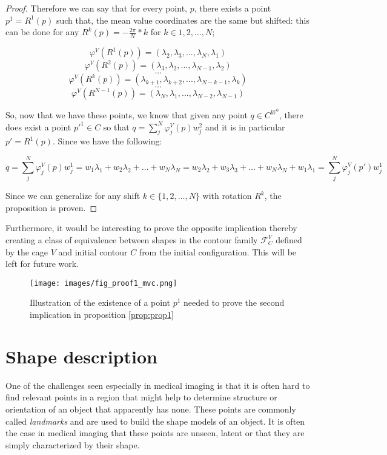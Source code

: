 \begin{proof}
  Therefore we can say that for every point, $p$, there exists a point $p^1=R^1(p)$ such that, the mean value coordinates are the same but shifted: this can be done for any $R^k(p)=-\frac{2\pi}{N}*k$ for $k\in {1,2, \dots, N}$;
   
  
  $$\varphi^V(R^1(p))= (\lambda_2, \lambda_3, ..., \lambda_N, \lambda_{1}) $$
  $$\varphi^V(R^2(p))= (\lambda_3, \lambda_2, ..., \lambda_{N-1}, \lambda_{2}) $$
  $$\dots$$
  $$\varphi^V(R^k(p))= (\lambda_{k+1}, \lambda_{k+2}, ..., \lambda_{N-k-1}, \lambda_{k}) $$
  $$\dots$$
  $$\varphi^V(R^{N-1}(p))= (\lambda_{N}, \lambda_{1}, ..., \lambda_{N-2}, \lambda_{N-1}) $$
  
    
  So, now that we have these points, we know that given any point $q\in C^{W^0}$, there does exist a point
  $p'^1\in C$ so that $q=\sum\limits_{j}^N\varphi_j^V(p)w_j^2$ and it is in particular $p'=R^1(p)$.
  Since we have the following:
  

	  $$q=\sum\limits_{j}^N\varphi_j^V(p)w_j^1=w_1\lambda_1+ w_2\lambda_2+ \dots + w_N\lambda_N =
	  w_2\lambda_2+ w_3\lambda_3+\dots+w_N\lambda_N+w_1\lambda_1= \sum\limits_{j}^N\varphi_j^V(p')w_j^1$$

  Since we can generalize for any shift $k\in \{1,2,\dots,N\}$ with rotation $R^k$, the proposition is proven.
  \end{proof}

  Furthermore, it would be interesting to prove the opposite implication thereby creating a class of equivalence between shapes in the contour family $\mathcal{F}_C^V$ defined by the cage $V$ and initial contour $C$ from the initial configuration. This will be left for future work.
  
   
   \begin{figure}[h!]
   	\centering
   	{\texttt{[image: images/fig\_proof1\_mvc.png]}}
   	\caption{Illustration of the existence of a point $p^1$ needed to prove the second implication in proposition \ref{prop:prop1}}
   	\label{fig:proof1_mvc}
   \end{figure}
   
 

\section{Shape description}
\label{subsec:shape_description}

One of the challenges seen especially in medical imaging is that it is often hard to find relevant points in a region that might help to determine structure or orientation of an object that apparently has none. These points are commonly called \textit{landmarks} and are used to build the shape models of an object. It is often the case in medical imaging that these points are unseen, latent or that they are simply characterized by their shape. 

